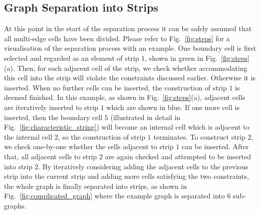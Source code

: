 \documentclass[conference]{IEEEtran}
\begin{document}
\subsection{Graph Separation into Strips}
At this point in the start of the separation process it can be safely assumed that all multi-edge cells have been divided. %
Please refer to Fig.~\ref{fig:steps} for a visualisation of the separation process with an example. One boundary cell is first selected and regarded as an element of strip $1$, shown in green in Fig.~\ref{fig:steps}(a).
Then, for each adjacent cell of the strip, we check whether accommodating this cell into the strip will violate the constraints discussed earlier. 
Otherwise it is inserted. 
When no further cells can be inserted, the construction of strip $1$ is deemed finished. 
In this example, as shown in Fig.~\ref{fig:steps}(a), adjacent cells are iteratively inserted to strip $1$ which are shown in blue. If one more cell is inserted, then the boundary cell $5$ (illustrated in detail in Fig.~\ref{fig:characteristic_string}) will become an internal cell which is adjacent to the internal cell $2$, so the construction of strip $1$ terminates.  
To construct strip $2$, we check one-by-one whether the cells adjacent to strip $1$ can be inserted. 
After that, all adjacent cells to strip $2$  are again checked and attempted to be inserted into strip $2$. 
By iteratively considering adding the adjacent cells to the previous strip into the current strip and adding more cells satisfying the two constraints, 
the whole graph is finally separated into strips, as shown in Fig.~\ref{fig:complicated_graph} where the example graph is separated into $6$ sub-graphs. 
\end{document}
